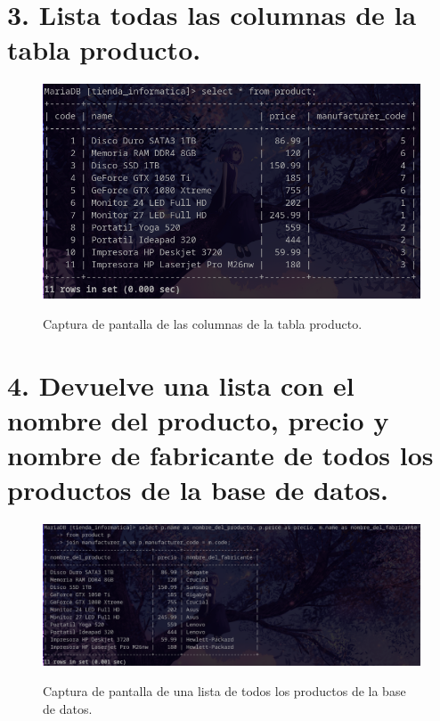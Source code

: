 \documentclass{article}
\begin{document}
\newpage %

\section*{3. Lista todas las columnas de la tabla producto.}

\begin{figure}[ht]
    \centering
    {
        \includegraphics[width=\linewidth]{03screenshot.png} %
    }
    \caption{Captura de pantalla de las columnas de la tabla producto.}
\end{figure}
\newpage %

\section*{4. Devuelve una lista con el nombre del producto, precio y nombre de fabricante de todos 
los productos de la base de datos.}

\begin{figure}[ht]
    \centering
    {
        \includegraphics[width=\linewidth]{04screenshot.png} %
    }
    \caption{Captura de pantalla de una lista de todos los productos de la base de datos.}
\end{figure}
\newpage %
\end{document}
